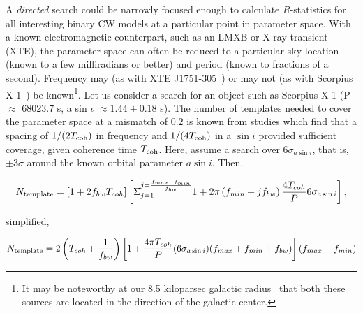 A \textit{directed} search could be narrowly focused enough to calculate $R$-statistics for all interesting binary CW models at a particular point in parameter space.
With a known electromagnetic counterpart, such as an LMXB or X-ray transient (XTE), the parameter space can often be reduced to a particular sky location (known to a few milliradians or better) and period (known to fractions of a second).
Frequency may (as with XTE J1751-305~\cite{Markwardt2002}) or may not (as with Scorpius X-1~\cite{Galloway2014}) be known\footnote{It may be noteworthy at our 8.5 kiloparsec galactic radius~\cite{KerrLyndenBell1986} that both these sources are located in the direction of the galactic center.}.
Let us consider a search for an object such  as Scorpius X-1 (P $\approx$$ $ 68023.7 s, a sin $\iota$ $\approx 1.44\pm0.18$ s). The number of templates needed to cover the parameter space at a mismatch of $0.2$ is known from studies which find that a spacing of $1/(2 T_\textup{coh})$ in frequency and $1/(4 T_\textup{coh})$ in a $\sin i$ provided sufficient coverage, given coherence time $T_\textup{coh}$. 
Here, assume a search over $6\sigma_{a \sin i}$, that is, $\pm 3 \sigma$ around the known orbital parameter $a\sin i$. 
Then,

\begin{equation}
N_{\textup{{template}}}=\left[1+2f_{bw}T_{coh}\right] \left[ {\displaystyle \Sigma}_{j=1}^{j = \frac{f_{max} - f_{min}}{f_{bw}}} 1 + 2\pi\left(f_{min} + j f_{bw}\right) \frac{4 T_{coh}}{P} 6 \sigma_{a \sin i} \right],
\label{N_template_full}
\end{equation}

\noindent simplified,

\begin{equation}
N_{\textup{template}} = 2 \left(T_{coh} + \frac{1}{f_{bw}}\right)\left[ 1+\frac{4 \pi T_{coh}}{P} (6\sigma_{a \sin i})(f_{max} + f_{min} + f_{bw})\right] (f_{max} - f_{min})
\label{N_template_simple}
\end{equation}

